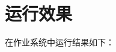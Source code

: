 ﻿\documentclass{article}
\begin{document}
\begin{CJK*}{GBK}{song}
\begin{itemize}
\end{itemize}

\section{运行效果}
\qquad 在作业系统中运行结果如下：

\begin{center}
\begin{figure}[ht]
\end{figure}
\end{center}


\end{CJK*}
\end{document}
